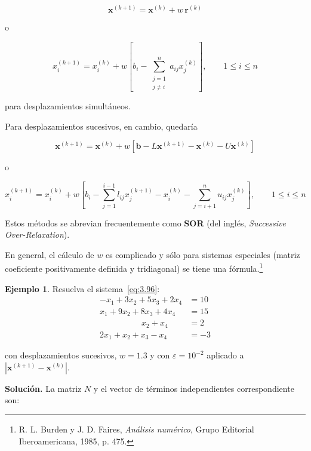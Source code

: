 \documentclass[12pt,letterpaper]{article}
\theoremstyle{definition}
\newtheorem{ejemplo}{Ejemplo}[section]
\theoremstyle{plain}
\theoremstyle{remark}
\begin{document}
\begin{equation}
\mathbf{x}^{(k+1)} = \mathbf{x}^{(k)} + w\, \mathbf{r}^{(k)}
\label{eq:3.104}
\tag{24}
\end{equation}

o

\begin{equation}
x_i^{(k+1)} = x_i^{(k)} + w \left[b_i - \sum_{\substack{j=1 \\ j \ne i}}^n a_{ij} x_j^{(k)}\right], \qquad 1 \le i \le n
\label{eq:3.105}
\tag{25}
\end{equation}

para desplazamientos simultáneos.

Para desplazamientos sucesivos, en cambio, quedaría

\begin{equation}
\mathbf{x}^{(k+1)} = \mathbf{x}^{(k)} + w \left[\mathbf{b} - L \mathbf{x}^{(k+1)} - \mathbf{x}^{(k)} - U \mathbf{x}^{(k)} \right]
\label{eq:3.106}
\tag{26}
\end{equation}

o

\begin{equation}
x_i^{(k+1)} = x_i^{(k)} + w \left[b_i - \sum_{j=1}^{i-1} l_{ij} x_j^{(k+1)} - x_i^{(k)} - \sum_{j=i+1}^n u_{ij} x_j^{(k)} \right], \qquad 1 \le i \le n
\label{eq:3.107}
\tag{27}
\end{equation}

Estos métodos se abrevian frecuentemente como \textbf{SOR} (del inglés, \textit{Successive Over-Relaxation}).

En general, el cálculo de $w$ es complicado y sólo para sistemas especiales (matriz coeficiente positivamente definida y tridiagonal) se tiene una fórmula.\footnote{R. L. Burden y J. D. Faires, \textit{Análisis numérico}, Grupo Editorial Iberoamericana, 1985, p. 475.}

\begin{ejemplo}
Resuelva el sistema~\eqref{eq:3.96}:
\[
\begin{aligned}
- x_1 + 3x_2 + 5x_3 + 2x_4 &= 10 \\
x_1 + 9x_2 + 8x_3 + 4x_4 &= 15 \\
\quad\quad\quad\quad\quad x_2 + x_4 &= 2 \\
2x_1 + x_2 + x_3 - x_4 &= -3
\end{aligned}
\]

con desplazamientos sucesivos, $w = 1.3$ y con $\varepsilon = 10^{-2}$ aplicado a $|\mathbf{x}^{(k+1)} - \mathbf{x}^{(k)}|$.
\end{ejemplo}
\textbf{Solución.} La matriz $N$ y el vector de términos independientes correspondiente son:
\end{document}
